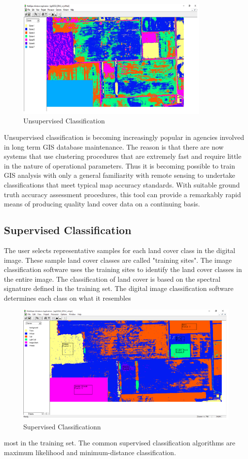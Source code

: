 \documentclass[document.tex]{subfiles}
\begin{document}
\begin{figure}[H]
	\begin{center}
		\includegraphics[height=6.0cm]{imgs/Unsupervised.png}
	\end{center}
	\caption{Unsupervised Classification}
	\label{fig: Unsupervised Classification}
\end{figure}
Unsupervised classification is becoming increasingly popular in agencies involved in
long term GIS database maintenance. The reason is that there are now systems that use
clustering procedures that are extremely fast and require little in the nature of operational parameters. Thus it is becoming possible to train GIS analysis with only a general
familiarity with remote sensing to undertake classifications that meet typical map accuracy standards. With suitable ground truth accuracy assessment procedures, this tool can provide a remarkably rapid means of producing quality land cover data on a continuing basis.
\subsection{Supervised Classification}
\noindent The user selects representative samples for each land cover class in the digital image.
These sample land cover classes are called "training sites". The image classification
software uses the training sites to identify the land cover classes in the entire image.
The classification of land cover is based on the spectral signature defined in the training set. The digital image classification software determines each class on what it resembles
\begin{figure}[H]
	\begin{center}
		\includegraphics[height=6.0cm]{imgs/Supervised.png}
	\end{center}
	\caption{Supervised Classificationn}
	\label{fig: Supervised Classification}
\end{figure}
most in the training set. The common supervised classification algorithms are maximum
likelihood and minimum-distance classification.
\end{document}
